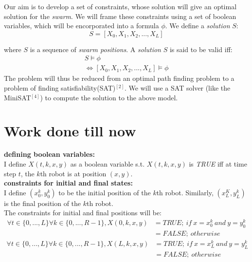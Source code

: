 \documentclass{article}[11pt]
\begin{document}
		Our aim is to develop a set of constraints, whose solution will give an optimal solution for the \textit{swarm}.
		We will frame these constraints using a set of boolean variables, which will be encorporated into a formula $\phi$.
		We define a \textit{solution} $S$:
		$$
			S = [X_0, X_1, X_2, . . . , X_L]  
		$$

		where $S$ is a sequence of \textit{swarm positions}.%
		A \textit{solution} $S$ is said to be valid iff:
		\begin{gather}
				S \models \phi \\
			\Leftrightarrow  [X_0, X_1, X_2, . . . , X_L] \models \phi
		\end{gather}
		The problem will thus be reduced from an optimal path finding problem to a problem of finding satisfiability(SAT)$^{[2]}$. 
		We will use a SAT solver (like the MiniSAT$^{[4]}$) to compute the solution to the above model.

	\section{Work done till now}
		\textbf{defining boolean variables:}\\
			I define $X(t, k, x, y)$ as a boolean variable s.t. $X(t, k, x, y)$ is \textit{TRUE} iff at time step $t$, the $k$th robot is at position $(x,y)$.\\
		
		\textbf{constraints for initial and final states:}\\
			I define $(x_0^k,y_0^k)$ to be the initial position of the $k$th robot.
			Similarly, $(x_L^K, y_L^k)$ is the final position of the $k$th robot.\\
			The constraints for initial and final positions will be:
			\begin{equation}
			\begin{split}
				\forall{t \in \{0,...,L\}}\forall{k \in \{0,...,R-1\}}, X(0, k, x, y) &= TRUE;\ if \ x = x_0^k \ and \ y=y_0^k\\
				                                    &= FALSE;\ otherwise
			\end{split}
			\end{equation}
			\begin{equation}
			\begin{split}
				\forall{t \in \{0,...,L\}}\forall{k \in \{0,...,R-1\}}, X(L, k, x, y) &= TRUE;\ if \ x = x_L^k \ and \ y=y_L^k \\
				                                    &= FALSE;\ otherwise
			\end{split}
			\end{equation}			
\end{document}

